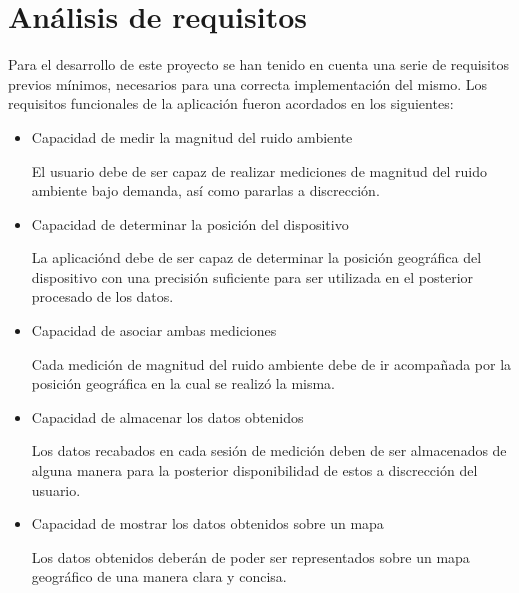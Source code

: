 \label{chp:Impl}

\section{Análisis de requisitos}
\label{sec:Requirements}

Para el desarrollo de este proyecto se han tenido en cuenta una serie de requisitos previos mínimos, necesarios para una correcta implementación del mismo. Los requisitos funcionales de la aplicación fueron acordados en los siguientes:

\begin{itemize}

\item Capacidad de medir la magnitud del ruido ambiente

El usuario debe de ser capaz de realizar mediciones de magnitud del ruido ambiente bajo demanda, así como pararlas a discrección.

\item Capacidad de determinar la posición del dispositivo

La aplicaciónd debe de ser capaz de determinar la posición geográfica del dispositivo con una precisión suficiente para ser utilizada en el posterior procesado de los datos.

\item Capacidad de asociar ambas mediciones

Cada medición de magnitud del ruido ambiente debe de ir acompañada por la posición geográfica en la cual se realizó la misma. 

\item Capacidad de almacenar los datos obtenidos

Los datos recabados en cada sesión de medición deben de ser almacenados de alguna manera para la posterior disponibilidad de estos a discrección del usuario.

\item Capacidad de mostrar los datos obtenidos sobre un mapa

Los datos obtenidos deberán de poder ser representados sobre un mapa geográfico de una manera clara y concisa.

\end{itemize}


